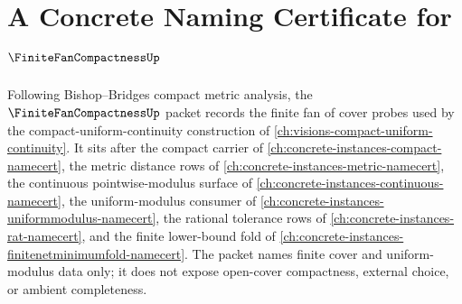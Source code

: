 \chapter{A Concrete Naming Certificate for $\FiniteFanCompactnessUp$}
\label{ch:concrete-instances-finite-fan-compactness-namecert}

Following Bishop--Bridges compact metric analysis, the $\FiniteFanCompactnessUp$ packet records the finite fan of cover probes used by the compact-uniform-continuity construction of \autoref{ch:visions-compact-uniform-continuity}. It sits after the compact carrier of \autoref{ch:concrete-instances-compact-namecert}, the metric distance rows of \autoref{ch:concrete-instances-metric-namecert}, the continuous pointwise-modulus surface of \autoref{ch:concrete-instances-continuous-namecert}, the uniform-modulus consumer of \autoref{ch:concrete-instances-uniformmodulus-namecert}, the rational tolerance rows of \autoref{ch:concrete-instances-rat-namecert}, and the finite lower-bound fold of \autoref{ch:concrete-instances-finitenetminimumfold-namecert}. The packet names finite cover and uniform-modulus data only; it does not expose open-cover compactness, external choice, or ambient completeness.

